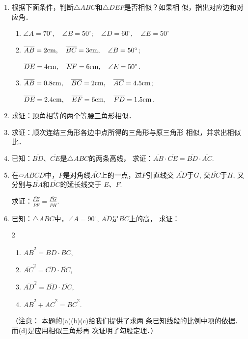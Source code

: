 \begin{ex}
\begin{enumerate}
    \item 根据下面条件，判断$\triangle ABC$和$\triangle DEF$是否相似？如果相
    似，指出对应边和对应角．
\begin{enumerate}
    \item $\angle A=70^{\circ},\quad \angle B=50^{\circ};\quad \angle D=60^{\circ},\quad \angle E=50^{\circ}$
    \item $\overline{AB}=2{\rm cm},\quad \overline{BC}=3{\rm cm},\quad \angle B=50^{\circ}$; 
    
    $\overline{DE}=4{\rm cm},\quad \overline{EF}=6{\rm cm},\quad \angle E=50^{\circ}$.
    \item $\overline{AB}=0.8{\rm cm},\quad \overline{BC}=2{\rm cm},\quad \overline{AC}=4.5{\rm cm}$; 
    
    $\overline{DE}=2.4{\rm cm},\quad \overline{EF}=6{\rm cm},\quad \overline{FD}=1.5{\rm cm}$.
\end{enumerate}

    \item 求证：顶角相等的两个等腰三角形相似．
    \item 求证：顺次连结三角形各边中点所得的三角形与原三角形
    相似，并求出相似比．
    \item 已知：$\overline{BD}$、$\overline{CE}$是$\triangle ABC$的两条高线，
    求证：$\overline{AB}\cdot \overline{CE}=\overline{BD}\cdot \overline{AC}$.

\item 在$\parallelogram{ABCD}$中，$P$是对角线$\overline{AC}$上的一点，过$P$引直线交
$\overline{AD}$于$G$, 交$\overline{BC}$于$H$, 又分别与$\overline{BA}$和$\overline{DC}$的延长线交于
$E$、$F$.

求证：$\frac{\overline{PE}}{\overline{PF}}=\frac{\overline{PG}}{\overline{PH}}$.

\item 已知：$\triangle ABC$中，$\angle A=90^{\circ}$, $\overline{AD}$是$\overline{BC}$上的高，
求证：
\begin{multicols}{2}
\begin{enumerate}
    \item $\overline{AB}^2=\overline{BD}\cdot \overline{BC}$,  
    \item $\overline{AC}^2=\overline{CD}\cdot \overline{BC}$, 
    \item $\overline{AD}^2=\overline{BD}\cdot \overline{DC}$, 
    \item $\overline{AB}^2+\overline{AC}^2=\overline{BC}^2$.
\end{enumerate}
\end{multicols}
（注意： 本题的(a)(b)(c)给我们提供了求两
条已知线段的比例中项的依据．而(d)是应用相似三角形再
次证明了勾股定理．）
\end{enumerate}
\end{ex}

